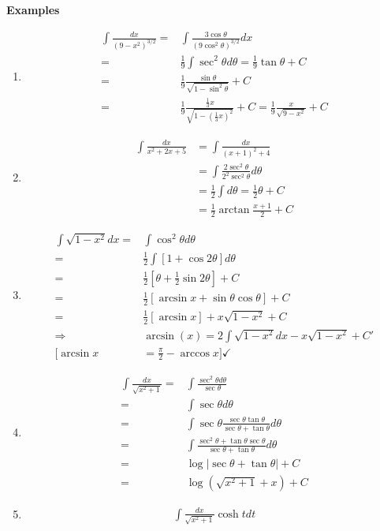\documentclass[12pt]{article}
\theoremstyle{plain}
\newcommand{\abs}[1]{\left| #1 \right|}
\begin{document}
	{\color{Brown}
	\textbf{Examples}
	\begin{enumerate}
		\item 
			\begin{align*}
				\int \frac{dx}{(9-x^2)^{3/2}}
				=&\int \frac{3\cos \theta}{(9\cos^2\theta)^{3/2}}dx\\
				=&\frac 19 \int \sec^2\theta d\theta 
				= \frac 19 \tan \theta + C \\
				=& \frac 19 \frac{\sin\theta}{\sqrt{1-\sin^2\theta}}+C\\
				=& \frac 19 \frac{\frac13 x}{\sqrt{1-(\frac13x)^2}}+C
				= \frac 19 \frac x{\sqrt{9-x^2}}+C
			\end{align*}
		\item 
			\begin{align*}
				\int \frac{dx}{x^2+2x+5} 
				&= \int \frac{dx}{(x+1)^2+4} 
				\tag{$x+1=2\tan\theta, dx=2\sec^2\theta d\theta$}\\
				&= \int \frac{2\sec^2\theta}{2^2\sec^2\theta}d\theta\\
				&= \frac12 \int d\theta = \frac12 \theta+C\\
				&= \frac12 \arctan \frac{x+1}2 + C
			\end{align*}

		\item 
			\begin{align*}
				\int \sqrt{1-x^2}dx
				=& \int \cos^2\theta d\theta\\
				=& \frac 12 \int [1+\cos 2\theta]d\theta\\
				=& \frac12[\theta + \frac12 \sin 2\theta] + C\\
				=& \frac12[\arcsin x + \sin \theta \cos \theta] + C\\
				=& \frac 12[\arcsin x]+ x\sqrt{1-x^2} + C\\
				\Rightarrow &\arcsin (x) = 2\int\sqrt{1-x^2}dx -x\sqrt{1-x^2}
				+ C'\\
				[\arcsin x &= \frac{\pi}2 -\arccos x] \checkmark
			\end{align*}

		\item 
			\begin{align*}
				\int \frac{dx}{\sqrt{x^2+1}}\tag{$x = \tan \theta, 
				dx = \sec^2 \theta d\theta$}
				=& \int \frac{\sec^2 \theta d\theta}{\sec \theta}\\
				=& \int \sec \theta d\theta\\
				=& \int \sec\theta \frac{\sec \theta \tan \theta}
				{\sec\theta + \tan \theta} d\theta\\
				=& \int \frac{\sec^2\theta +\tan \theta \sec \theta}
				{\sec \theta + \tan \theta} d\theta\\
				=& \log \abs{\sec\theta + \tan \theta} + C\\
				=& \log (\sqrt{x^2+1}+x)+C
			\end{align*}

		\item 
			\begin{align*}
				\int \frac{dx}{\sqrt{x^2+1}}\tag{$x = \tan \theta, 
				=& \int \frac{\cosh t}{\cosh t} dt
			\end{align*}
	\end{enumerate}

	}
\end{document}
